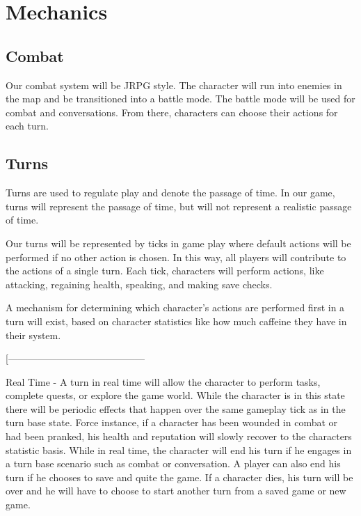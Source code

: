 \documentclass[9pt]{article}
\author{Tyler Wittreich, Tessa Saul}
\begin{document}
\section*{Mechanics}

\subsection*{Combat}
Our combat system will be JRPG style. 
The character will run into enemies in the map and be transitioned
 into a battle mode. The battle mode will be used for combat and 
 conversations. From there, characters can choose their actions for each 
 turn. 
 
 
 
 
 
 
 

\subsection*{Turns}

Turns are used to regulate play and denote the passage of time. 
In our game, turns will represent the passage of time, but will 
not represent a realistic passage of time. 

Our turns will be represented by ticks in game play where default
actions will be performed if no other action is chosen. 
In this way, all players will contribute to the actions of a single 
turn. Each tick, characters will perform actions, like attacking,
regaining health, speaking, and making save checks. 

A mechanism for determining which character's actions are performed
first in a turn will exist, based on character statistics like how much
caffeine they have in their system. 


\smallskip
[------------------------------------------

Real Time - 
A turn in real time will allow the character to perform tasks, complete quests, or explore the game world. While the character is in this state there will be periodic effects that happen over the same gameplay tick as in the turn base state. Force instance, if a character has been wounded in combat or had been pranked, his health and reputation will slowly recover to the characters statistic basis. While in real time, the character will end his turn if he engages in a turn base scenario such as combat or conversation. A player can also end his turn if he chooses to save and quite the game. If a character dies, his turn will be over and he will have to choose to start another turn from a saved game or new game. 
\end{document}
